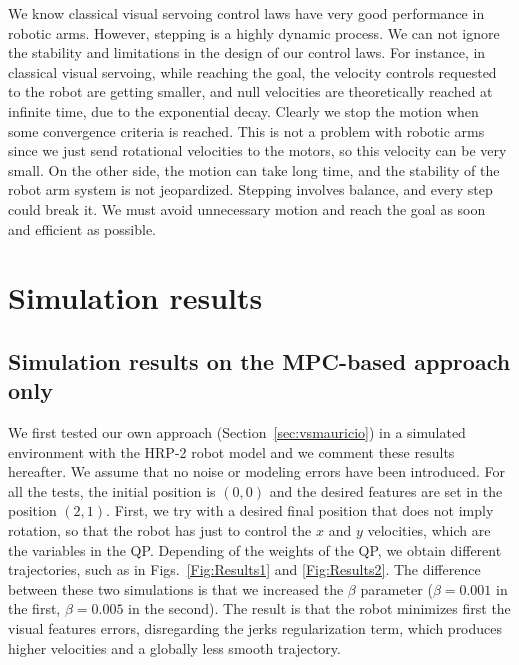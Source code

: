We know classical visual servoing control laws have very good performance in robotic arms. However, stepping is a highly dynamic process. We can not ignore the stability and limitations in the design of our control laws. For instance, in classical visual servoing, while reaching the goal, the velocity controls requested to the robot are getting smaller, and null velocities are theoretically reached at infinite time, due to the exponential decay. Clearly we stop the motion when some convergence criteria is reached. This is not a problem with robotic arms since we just send rotational velocities to the motors, so this velocity can be very small. On the other side, the motion can take long time, and the stability of the robot arm system is not jeopardized. Stepping involves balance, and every step could break it. We must avoid unnecessary motion and reach the goal as soon and efficient as possible.


\section{Simulation results}

\subsection{Simulation results on the MPC-based approach only}

We first tested our own approach (Section~\ref{sec:vsmauricio}) in a simulated environment with the HRP-2 robot model and we comment these results hereafter. We assume that no noise or modeling errors have been introduced. For all the tests, the initial position is $(0,0)$ and the desired features are set in the position $(2,1)$. First, we try with a desired final position that does not imply rotation, so that the robot has just to control the $x$ and $y$ velocities, which are the variables in the QP. Depending of the weights of the QP, we obtain different trajectories, such as in Figs.~\ref{Fig:Results1} and \ref{Fig:Results2}. The difference between these two simulations is that we increased the $\beta $ parameter ($\beta=0.001$ in the first, $\beta =0.005$ in the second). The result is that the robot minimizes first the visual features errors, disregarding the jerks regularization term, which produces higher velocities and a globally less smooth trajectory.



